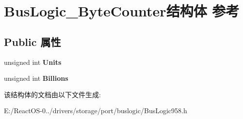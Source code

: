 \hypertarget{struct_bus_logic___byte_counter}{}\section{Bus\+Logic\+\_\+\+Byte\+Counter结构体 参考}
\label{struct_bus_logic___byte_counter}
\subsection*{Public 属性}
\begin{DoxyCompactItemize}
\item 
\mbox{\label{struct_bus_logic___byte_counter_a69679401ab779681271eb8df4d57f698}} 
unsigned int {\bfseries Units}
\item 
\mbox{\label{struct_bus_logic___byte_counter_a2a8047c79834ccf04bde0070b87ec9f9}} 
unsigned int {\bfseries Billions}
\end{DoxyCompactItemize}


该结构体的文档由以下文件生成\+:\begin{DoxyCompactItemize}
\item 
E\+:/\+React\+O\+S-\/0../drivers/storage/port/buslogic/Bus\+Logic958.\+h\end{DoxyCompactItemize}
